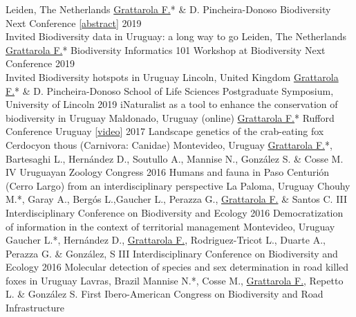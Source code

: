 \documentclass[9pt]{developercv} %
\begin{document}
\begin{entrylist}
		{Leiden, The Netherlands}
		{\underline{Grattarola F.}* \& D. Pincheira-Donoso \slashsep Biodiversity Next Conference [\href{https://flograttarola.com/pdf/BISS_article_37715.pdf}{abstract}]}
	\entrylong
		{2019\\\footnotesize{Invited}}
		{Biodiversity data in Uruguay: a long way to go}
		{Leiden, The Netherlands}
		{\underline{Grattarola F.}* \slashsep Biodiversity Informatics 101 Workshop at Biodiversity Next Conference}
	\entrylong
		{2019\\\footnotesize{Invited}}
		{Biodiversity hotspots in Uruguay}
		{Lincoln, United Kingdom}
		{\underline{Grattarola F.}* \& D. Pincheira-Donoso \slashsep School of Life Sciences Postgraduate Symposium, University of Lincoln}
	\entrylong
		{2019}
		{iNaturalist as a tool to enhance the conservation of biodiversity in Uruguay}
		{Maldonado, Uruguay (online)}
		{\underline{Grattarola F.}* \slashsep Rufford Conference Uruguay  [\href{https://youtu.be/3_lM-gPNLWY}{video}]}
	\entrylong
		{2017}
		{Landscape genetics of the crab-eating fox Cerdocyon thous (Carnivora: Canidae)}
		{Montevideo, Uruguay}
		{\underline{Grattarola F.}*, Bartesaghi L., Hernández D., Soutullo A., Mannise N., González S. \& Cosse M. \slashsep IV Uruguayan Zoology Congress}
	\entrylong
		{2016}
		{Humans and fauna in Paso Centurión (Cerro Largo) from an interdisciplinary perspective}
		{La Paloma, Uruguay}
		{Chouhy M.*, Garay A., Bergós L.,Gaucher L., Perazza G., \underline{Grattarola F.} \& Santos C. \slashsep III Interdisciplinary Conference on Biodiversity and Ecology}
	\entrylong
		{2016}
		{Democratization of information in the context of territorial management}
		{Montevideo, Uruguay}
		{Gaucher L.*, Hernández D., \underline{Grattarola F.}, Rodriguez-Tricot L., Duarte A., Perazza G. \& González, S \slashsep III Interdisciplinary Conference on Biodiversity and Ecology}
	\entrylong
		{2016}
		{Molecular detection of species and sex determination in road killed foxes in Uruguay}
		{Lavras, Brazil}
		{Mannise N.*, Cosse M., \underline{Grattarola F.}, Repetto L. \& González S. \slashsep First Ibero-American Congress on Biodiversity and Road Infrastructure}		
\end{entrylist}


\end{document}
